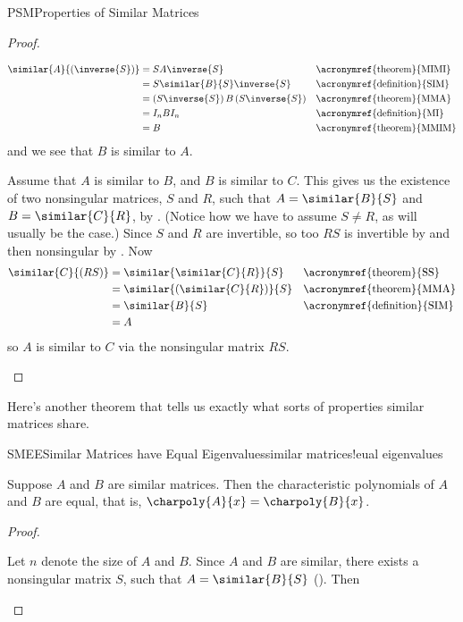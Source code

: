 \begin{subsect}{PSM}{Properties of Similar Matrices}
\begin{proof}
\begin{para}
%
\begin{align*}
\similar{A}{(\inverse{S})}&=SA\inverse{S}&&\text{\acronymref{theorem}{MIMI}}\\
&=S\similar{B}{S}\inverse{S}&&\text{\acronymref{definition}{SIM}}\\
&=\left(S\inverse{S}\right)B\left(S\inverse{S}\right)&&\text{\acronymref{theorem}{MMA}}\\
&=I_nBI_n&&\text{\acronymref{definition}{MI}}\\
&=B&&\text{\acronymref{theorem}{MMIM}}
\end{align*}
%
and we see that $B$ is similar to $A$.\end{para}
%
\begin{para}Assume that $A$ is similar to $B$, and $B$ is similar to $C$.  This gives us the existence of two nonsingular matrices, $S$ and $R$, such that $A=\similar{B}{S}$ and $B=\similar{C}{R}$, by .  (Notice how we have to assume $S\neq R$, as will usually be the case.)  Since $S$ and $R$ are invertible, so too $RS$ is invertible by  and then nonsingular by .  Now
%
\begin{align*}
\similar{C}{(RS)}&=\similar{\similar{C}{R}}{S}&&\text{\acronymref{theorem}{SS}}\\
&=\similar{\left(\similar{C}{R}\right)}{S}&&\text{\acronymref{theorem}{MMA}}\\
&=\similar{B}{S}&&\text{\acronymref{definition}{SIM}}\\
&=A
\end{align*}
%
so $A$ is similar to $C$ via the nonsingular matrix $RS$.\end{para}
%
\end{proof}
%
\begin{para}Here's another theorem that tells us exactly what sorts of properties similar matrices share.\end{para}
%
\begin{theorem}{SMEE}{Similar Matrices have Equal Eigenvalues}{similar matrices!eual eigenvalues}
\begin{para}Suppose $A$ and $B$ are similar matrices.  Then the characteristic polynomials of $A$ and $B$ are equal, that is, $\charpoly{A}{x}=\charpoly{B}{x}$.\end{para}
\end{theorem}
%
\begin{proof}
\begin{para}Let $n$ denote the size of $A$ and $B$.  Since $A$ and $B$ are similar, there exists a nonsingular matrix $S$, such that $A=\similar{B}{S}$ ().  Then

\end{para}
\end{proof}
\end{subsect}

